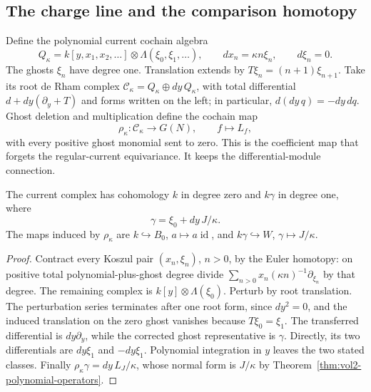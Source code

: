 \subsection{The charge line and the comparison homotopy}

Define the polynomial current cochain algebra
\[
 Q_\kappa=k[y,x_1,x_2,\ldots]\otimes
                  \Lambda(\xi_0,\xi_1,\ldots),\qquad
 dx_n=\kappa n\xi_n,\qquad d\xi_n=0.
\]
The ghosts $\xi_n$ have degree one. Translation extends by
$T\xi_n=(n+1)\xi_{n+1}$. Take its root de Rham complex
$\mathcal C_\kappa=Q_\kappa\oplus dy\,Q_\kappa$, with total
differential $d+dy(\partial_y+T)$ and forms written on the left;
in particular, $d(dy\,q)=-dy\,dq$. Ghost deletion and multiplication
define the cochain map
\begin{equation}\label{eq:vol2-current-forgetting}
 \rho_\kappa:\mathcal C_\kappa\longrightarrow G(N),
 \qquad f\longmapsto L_f,
\end{equation}
with every positive ghost monomial sent to zero. This is the
coefficient map that forgets the regular-current equivariance.
It keeps the differential-module connection.

\begin{proposition}\label{prop:vol2-charge-image}
The current complex has cohomology $k$ in degree zero and $k\gamma$
in degree one, where
\[
 \gamma=\xi_0+dy\,J/\kappa.
\]
The maps induced by $\rho_\kappa$ are
$k\hookrightarrow B_0$, $a\mapsto a\operatorname{id}$, and
$k\gamma\hookrightarrow W$, $\gamma\mapsto J/\kappa$.
\end{proposition}
\begin{proof}
Contract every Koszul pair $(x_n,\xi_n)$, $n>0$, by the Euler
homotopy: on positive total polynomial-plus-ghost degree divide
$\sum_{n>0}x_n(\kappa n)^{-1}\partial_{\xi_n}$ by that degree.
The remaining complex is $k[y]\otimes\Lambda(\xi_0)$.
Perturb by root translation. The perturbation series terminates
after one root form, since $dy^2=0$, and the induced translation
on the zero ghost vanishes because $T\xi_0=\xi_1$.
The transferred differential is $dy\partial_y$, while the
corrected ghost representative is $\gamma$. Directly, its two
differentials are $dy\xi_1$ and $-dy\xi_1$.
Polynomial integration in $y$ leaves the two stated classes.
Finally $\rho_\kappa\gamma=dy\,L_J/\kappa$, whose normal form
is $J/\kappa$ by Theorem~\ref{thm:vol2-polynomial-operators}.
\end{proof}

